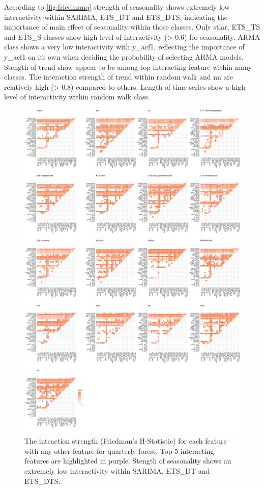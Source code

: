 \documentclass[11pt,a4paper,]{article}
\begin{document}
According to \autoref{fig:friedmanq} strength of seasonality shows extremely low interactivity within SARIMA, ETS\_DT and ETS\_DTS, indicating the importance of main effect of seasonality within those classes. Only stlar, ETS\_TS and ETS\_S classes show high level of interactivity (\textgreater{} 0.6) for seasonality. ARMA class shows a very low interactivity with y\_acf1, reflecting the importance of y\_acf1 on its own when deciding the probability of selecting ARMA models. Stength of trend show appear to be among top interacting feature within many classes. The interaction strength of trend within random walk and nn are relatively high (\textgreater{} 0.8) compared to others. Length of time series show a high level of interactivity within random walk class.

\begin{figure}
\centering
\includegraphics{figures/friedmanq-1.pdf}
\caption{\label{fig:friedmanq}The inteaction strength (Friedman's H-Statistic) for each feature with any other feature for quarterly forest. Top 5 interacting features are highlighted in purple. Stength of seasonality shows an extremely low interactivity within SARIMA, ETS\_DT and ETS\_DTS.}
\end{figure}
\end{document}
